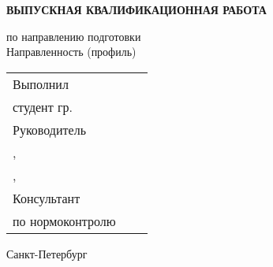 \vspace{0pt plus2fill} %


{\centering%
	
	\MakeUppercase{\bfseries{}Выпускная квалификационная работа} \\ 
	\MakeUppercase{\thesisDegree}%


{\centering%
	\MakeUppercase{\bfseries{\thesisTitle}}}%

}\par%

\noindent	по направлению подготовки \thesisSpecialtyCodeAndTitle{}\\%
\noindent	Направленность (профиль)	\thesisOPCodeAndTitle %
\par%





\vspace{4mm plus2fill}%

\noindent
\begin{tabularx}{\linewidth}{lXl}
	Выполнил              &	   &             \\
	студент гр.~\group     &    & \Author     \\[\mfloatsep]

	Руководитель 		  &    &             \\
	\SupervisorJob,		  &    &             \\
	\SupervisorDegree, \SupervisorTitle 	  &    & \Supervisor \\[\mfloatsep]
	
	
	Консультант  &    &  \\   	
	по нормоконтролю  		 	  &    & \ConsultantNorm  %
\end{tabularx} %


%
\vspace{0pt plus4fill}%


\begin{center}%
Санкт-Петербург\\
\thesisYear
\end{center}%
\restoregeometry
\newpage